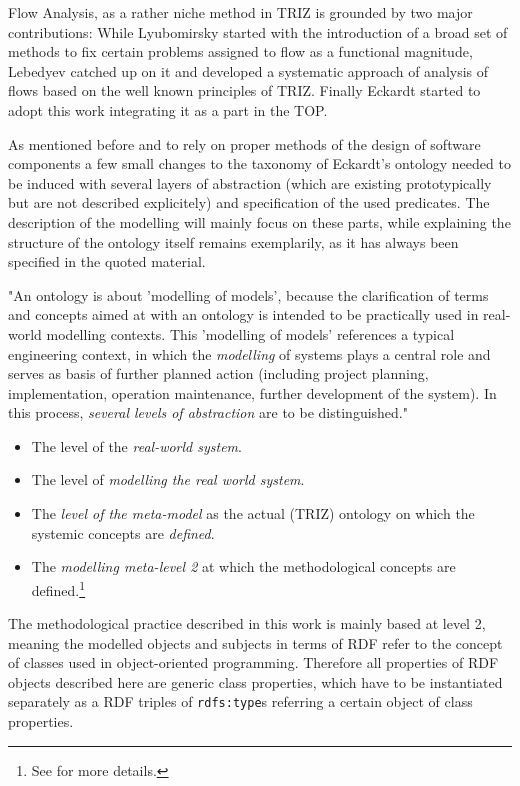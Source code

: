 \documentclass[a4paper,11pt]{article}
\begin{document}
Flow Analysis, as a rather niche method in TRIZ is grounded by two major
contributions: While Lyubomirsky \cite{Lyubomirsky2006} started with the
introduction of a broad set of methods to fix certain problems assigned to
flow as a functional magnitude, Lebedyev \cite{Lebedyev2011} \cite{Lebedyev2015}
catched up on it and developed a systematic approach of analysis of flows
based on the well known principles of TRIZ. Finally Eckardt \cite{Eckardt2020}
started to adopt this work integrating it as a part in the TOP.

As mentioned before and to rely on proper methods of the design of software
components a few small changes to the taxonomy of Eckardt's ontology needed to
be induced with several layers of abstraction (which are existing
prototypically but are not described explicitely) and specification of the
used predicates. The description of the modelling will mainly focus on these
parts, while explaining the structure of the ontology itself remains
exemplarily, as it has always been specified in the quoted material.

"An ontology is about 'modelling of models', because the clarification of
terms and concepts aimed at with an ontology is intended to be practically
used in real-world modelling contexts. This 'modelling of models' references a
typical engineering context, in which the \emph{modelling} of systems plays a
central role and serves as basis of further planned action (including project
planning, implementation, operation maintenance, further development of the
system).  In this process, \emph{several levels of abstraction} are to be
distinguished." \cite{Graebe2021}

\begin{itemize}[noitemsep]
\item[0.] The level of the \emph{real-world system}. 
\item[1.] The level of \emph{modelling the real world system}. 
\item[2.] The \emph{level of the meta-model} as the actual (TRIZ) ontology on
  which the systemic concepts are \emph{defined}.
\item[3.] The \emph{modelling meta-level 2} at which the methodological
concepts are defined.\footnote{See \cite{Graebe2021} for more details.} 
\end{itemize}

The methodological practice described in this work is mainly based at level 2,
meaning the modelled objects and subjects in terms of RDF refer to the concept
of classes used in object-oriented programming.  Therefore all properties of
RDF objects described here are generic class properties, which have to be
instantiated separately as a RDF triples of \texttt{rdfs:type}s referring a
certain object of class properties.
\end{document}
